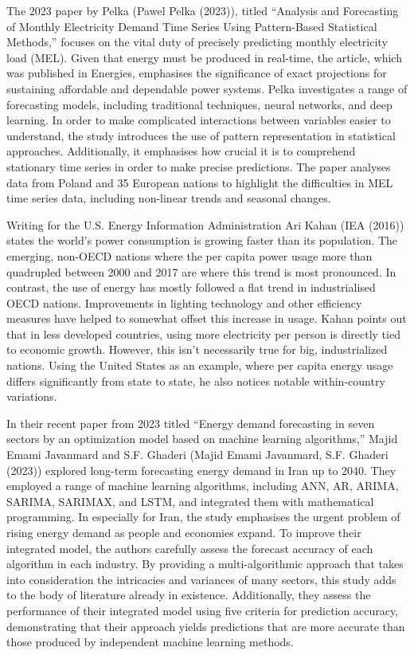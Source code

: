\documentclass[mstat,12pt]{unswthesis}
\begin{document}
The 2023 paper by Pelka (Pawel Pelka (2023)), titled ``Analysis and
Forecasting of Monthly Electricity Demand Time Series Using
Pattern-Based Statistical Methods,'' focuses on the vital duty of
precisely predicting monthly electricity load (MEL). Given that energy
must be produced in real-time, the article, which was published in
Energies, emphasises the significance of exact projections for
sustaining affordable and dependable power systems. Pelka investigates a
range of forecasting models, including traditional techniques, neural
networks, and deep learning. In order to make complicated interactions
between variables easier to understand, the study introduces the use of
pattern representation in statistical approaches. Additionally, it
emphasises how crucial it is to comprehend stationary time series in
order to make precise predictions. The paper analyses data from Poland
and 35 European nations to highlight the difficulties in MEL time series
data, including non-linear trends and seasonal changes.

Writing for the U.S. Energy Information Administration Ari Kahan (IEA
(2016)) states the world's power consumption is growing faster than its
population. The emerging, non-OECD nations where the per capita power
usage more than quadrupled between 2000 and 2017 are where this trend is
most pronounced. In contrast, the use of energy has mostly followed a
flat trend in industrialised OECD nations. Improvements in lighting
technology and other efficiency measures have helped to somewhat offset
this increase in usage. Kahan points out that in less developed
countries, using more electricity per person is directly tied to
economic growth. However, this isn't necessarily true for big,
industrialized nations. Using the United States as an example, where per
capita energy usage differs significantly from state to state, he also
notices notable within-country variations.

In their recent paper from 2023 titled ``Energy demand forecasting in
seven sectors by an optimization model based on machine learning
algorithms,'' Majid Emami Javanmard and S.F. Ghaderi (Majid Emami
Javanmard, S.F. Ghaderi (2023)) explored long-term forecasting energy
demand in Iran up to 2040. They employed a range of machine learning
algorithms, including ANN, AR, ARIMA, SARIMA, SARIMAX, and LSTM, and
integrated them with mathematical programming. In especially for Iran,
the study emphasises the urgent problem of rising energy demand as
people and economies expand. To improve their integrated model, the
authors carefully assess the forecast accuracy of each algorithm in each
industry. By providing a multi-algorithmic approach that takes into
consideration the intricacies and variances of many sectors, this study
adds to the body of literature already in existence. Additionally, they
assess the performance of their integrated model using five criteria for
prediction accuracy, demonstrating that their approach yields
predictions that are more accurate than those produced by independent
machine learning methods.
\end{document}
